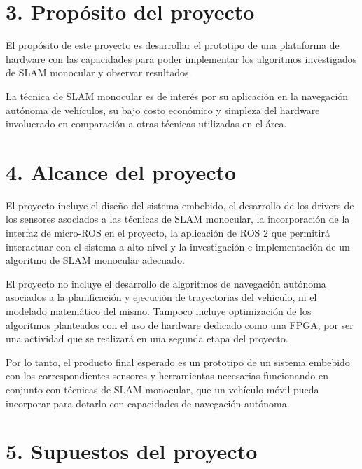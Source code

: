 \documentclass[
11pt, %
codirector, %
]{charter}
\begin{document}
\section{3. Propósito del proyecto}
\label{sec:proposito}

El propósito de este proyecto es desarrollar el prototipo de una plataforma de hardware con las capacidades para poder implementar los algoritmos investigados de SLAM monocular y observar resultados.

La técnica de SLAM monocular es de interés por su aplicación en la navegación autónoma de vehículos, su bajo costo económico y simpleza del hardware involucrado en comparación a otras técnicas utilizadas en el área.

\section{4. Alcance del proyecto}
\label{sec:alcance}

El proyecto incluye el diseño del sistema embebido, el desarrollo de los drivers de los sensores asociados a las técnicas de SLAM monocular, la incorporación de la interfaz de micro-ROS en el proyecto, la aplicación de ROS 2 que permitirá interactuar con el sistema a alto nivel y la investigación e implementación de un algoritmo de SLAM monocular adecuado.

El proyecto no incluye el desarrollo de algoritmos de navegación autónoma asociados a la planificación y ejecución de trayectorias del vehículo, ni el modelado matemático del mismo. Tampoco incluye optimización de los algoritmos planteados con el uso de hardware dedicado como una FPGA, por ser una actividad que se realizará en una segunda etapa del proyecto.

Por lo tanto, el producto final esperado es un prototipo de un sistema embebido con los correspondientes sensores y herramientas necesarias funcionando en conjunto con técnicas de SLAM monocular, que un vehículo móvil pueda incorporar para dotarlo con capacidades de navegación autónoma.

\section{5. Supuestos del proyecto}
\label{sec:supuestos}


\end{document}
